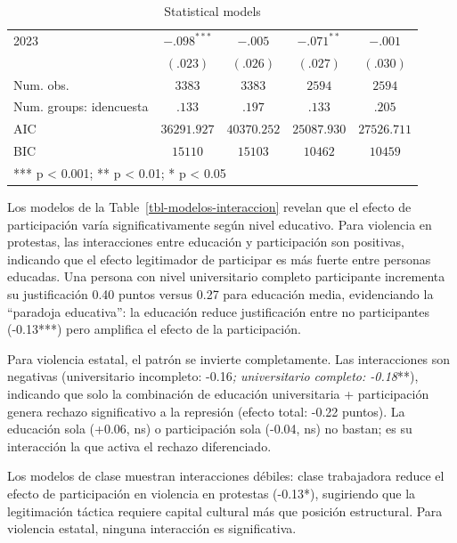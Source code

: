 \documentclass[
  13pt,
]{article}
\begin{document}
\begin{table}
{\begin{center}
{\begin{tabular}{l c c c c}
2023                                      & $-.098^{***}$ & $-.005$       & $-.071^{**}$  & $-.001$       \\
                                          & $(.023)$      & $(.026)$      & $(.027)$      & $(.030)$      \\
\midrule
Num. obs.                                 & $3383$        & $3383$        & $2594$        & $2594$        \\
Num. groups: idencuesta                   & $.133$        & $.197$        & $.133$        & $.205$        \\
AIC                                       & $36291.927$   & $40370.252$   & $25087.930$   & $27526.711$   \\
BIC                                       & $15110$       & $15103$       & $10462$       & $10459$       \\
\bottomrule
\multicolumn{5}{l}{\scriptsize{*** p < 0.001; ** p < 0.01; * p < 0.05}}
\end{tabular}
}
\caption{Statistical models}
\label{}
\end{center}

}

\end{table}%

Los modelos de la Table~\ref{tbl-modelos-interaccion} revelan que el
efecto de participación varía significativamente según nivel educativo.
Para violencia en protestas, las interacciones entre educación y
participación son positivas, indicando que el efecto legitimador de
participar es más fuerte entre personas educadas. Una persona con nivel
universitario completo participante incrementa su justificación 0.40
puntos versus 0.27 para educación media, evidenciando la ``paradoja
educativa'': la educación reduce justificación entre no participantes
(-0.13***) pero amplifica el efecto de la participación.

Para violencia estatal, el patrón se invierte completamente. Las
interacciones son negativas (universitario incompleto: -0.16\emph{;
universitario completo: -0.18}**), indicando que solo la combinación de
educación universitaria + participación genera rechazo significativo a
la represión (efecto total: -0.22 puntos). La educación sola (+0.06, ns)
o participación sola (-0.04, ns) no bastan; es su interacción la que
activa el rechazo diferenciado.

Los modelos de clase muestran interacciones débiles: clase trabajadora
reduce el efecto de participación en violencia en protestas (-0.13*),
sugiriendo que la legitimación táctica requiere capital cultural más que
posición estructural. Para violencia estatal, ninguna interacción es
significativa.
\end{document}
